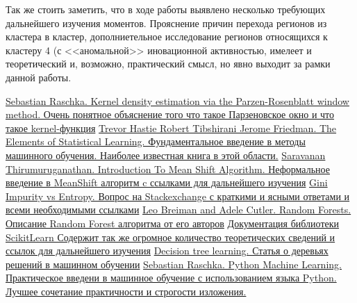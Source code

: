 \documentclass[11pt]{article}
\begin{document}
Так же стоить заметить, что в ходе работы выявлено несколько требующих
дальнейшего изучения моментов. Прояснение причин перехода регионов из
кластера в кластер, дополниетельное исследование регионов относящихся к
кластеру 4 (с <<аномальной>> иновационной активностью, имелеет и
теоретический и, возможно, практический смысл, но явно выходит за рамки
данной работы.


\begin{thebibliography}{}
     \href{http://sebastianraschka.com/Articles/2014_kernel_density_est.html}{ Sebastian Raschka. Kernel density estimation via the Parzen-Rosenblatt window method. Очень понятное объяснение того что такое Парзеновское окно и что такое kernel-функция}
     \href{https://web.stanford.edu/~hastie/ElemStatLearn/} {Trevor Hastie Robert Tibshirani Jerome Friedman. The Elements of Statistical Learning.  Фундаментальное введение в методы машинного обучения. Наиболее известная книга в этой области.}
     \href{https://saravananthirumuruganathan.wordpress.com/about/} { Saravanan Thirumuruganathan. Introduction To Mean Shift Algorithm. Неформальное введение в MeanShift алгоритм c ссылками для дальнейшего изучения}
     \href{https://datascience.stackexchange.com/questions/10228/gini-impurity-vs-entropy} {Gini Impurity vs Entropy. Вопрос на Stackexchange с краткими и ясными ответами и всеми необходимыми ссылками}
     \href{https://www.stat.berkeley.edu/~breiman/RandomForests/cc_home.htm} {Leo Breiman and Adele Cutler. Random Forests. Описание Random Forest алгоритма от его авторов}
     \href{http://scikit-learn.org/stable/documentation.html} {Документация библиотеки ScikitLearn Содержит так же огромное количество теоретических сведений и ссылок для дальнейшего изучения}
     \href{https://en.wikipedia.org/wiki/Decision_tree_learning} {Decision tree learning. Статья о деревьях решений в машинном обучении}
     \href{https://www.amazon.com/Python-Machine-Learning-Sebastian-Raschka/dp/1783555130} {  Sebastian Raschka. Python Machine Learning. Практическое введени в машинное обучение с использованием языка Python. Лучшее сочетание практичности и строгости изложения.}
\end{thebibliography}


    
    
    
    
\end{document}
